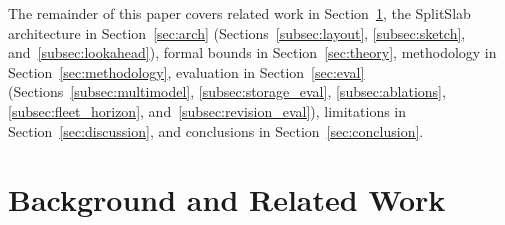 \documentclass[final,5p,times,twocolumn]{elsarticle}
\theoremstyle{definition}
\theoremstyle{remark}
\newcommand{\SplitSlab}{\textup{\textsc{SplitSlab}}}
\def\SplitSlab{SplitSlab}%
\begin{document}
The remainder of this paper covers related work in Section~\ref{sec:related}, the \SplitSlab{} architecture in Section~\ref{sec:arch} (Sections~\ref{subsec:layout}, \ref{subsec:sketch}, and~\ref{subsec:lookahead}), formal bounds in Section~\ref{sec:theory}, methodology in Section~\ref{sec:methodology}, evaluation in Section~\ref{sec:eval} (Sections~\ref{subsec:multimodel}, \ref{subsec:storage_eval}, \ref{subsec:ablations}, \ref{subsec:fleet_horizon}, and~\ref{subsec:revision_eval}), limitations in Section~\ref{sec:discussion}, and conclusions in Section~\ref{sec:conclusion}.

\section{Background and Related Work}\label{sec:related}
\end{document}
